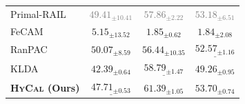 \begin{table}[t!]
{\begin{tabular}{lccc}
\midrule
Primal-RAIL~\cite{xu2024advancing}
  & \textcolor{gray}{$49.41_{\pm 10.41}$} & \textcolor{gray}{$57.86_{\pm 2.22}$} & \textcolor{gray}{$53.18_{\pm 6.51}$} \\\hdashline
FeCAM~\cite{goswami2023fecam}
  & $5.15_{\pm 13.52}$   & $1.85_{\pm 0.62}$  & $1.84_{\pm 2.08}$ \\
RanPAC~\cite{mcdonnell2023ranpac}
  & $\mathbf{50.07_{\pm 8.59}}$ & $56.44_{\pm 10.35}$ & $\underline{52.57_{\pm 1.16}}$ \\
KLDA~\cite{momeni2025continual}
  & $42.39_{\pm 0.64}$   & $\underline{58.79_{\pm 1.47}}$ & $49.26_{\pm 0.95}$ \\
\textbf{\textsc{HyCal} (Ours)}
  & $\underline{47.71_{\pm 0.53}}$ & $\mathbf{61.39_{\pm 1.05}}$ & $\mathbf{53.70_{\pm 0.74}}$ \\
\bottomrule
\end{tabular}
}%
\end{table}
